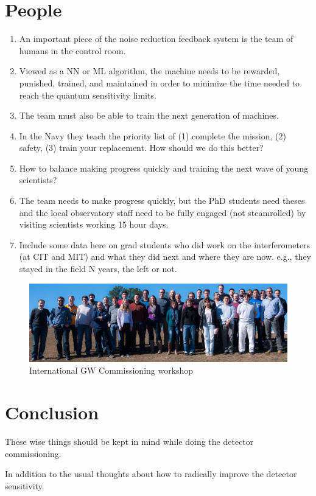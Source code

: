 \section{People}
\begin{enumerate}
\item An important piece of the noise reduction feedback system
  is the team of humans in the control room.
\item Viewed as a NN or ML algorithm, the machine needs to be
  rewarded, punished, trained, and maintained in order to minimize
  the time needed to reach the quantum sensitivity limits.
\item The team must also be able to train the next generation of machines.
\item In the Navy they teach the priority list of (1) complete the mission,
  (2) safety, (3) train your replacement. How should we do this better?
\item How to balance making progress quickly and training the next
  wave of young scientists?
\item The team needs to make progress quickly, but the PhD
  students need theses and the local observatory staff need to
  be fully engaged (not steamrolled) by visiting scientists
  working 15 hour days.
\item Include some data here on grad students who did work on the
  interferometers (at CIT and MIT) and what they did next and where
  they are now. e.g., they stayed in the field N years, the left or not.
\end{enumerate}

\begin{figure}[h]
\centering
\includegraphics[width=\columnwidth]{Figures/GroupPhoto_LLOworkshop13.jpg}
\caption{International GW Commissioning workshop}
\label{fig:workshopPhotoLLO}
\end{figure}

\section{Conclusion}
These wise things should be kept in mind while doing the detector commissioning.

In addition to the usual thoughts about how to radically improve the detector sensitivity.
